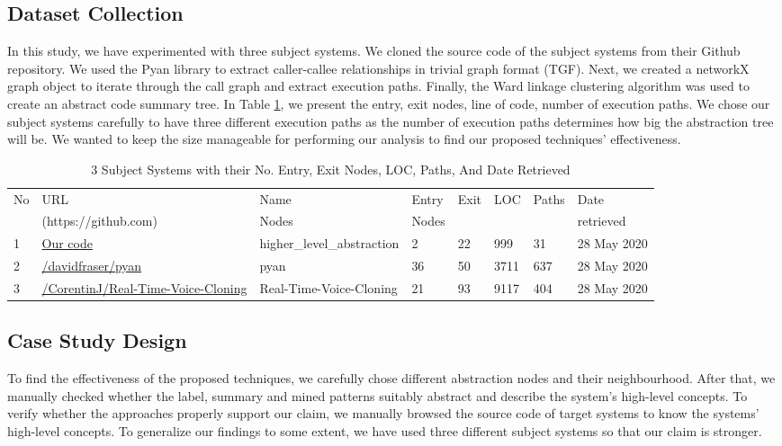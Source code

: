 \subsection{Dataset Collection}
In this study, we have experimented with three subject systems. We cloned the source code of the subject systems from their Github repository. We used the Pyan library to extract caller-callee relationships in trivial graph format (TGF). Next, we created a networkX graph object to iterate through the call graph and extract execution paths. Finally, the Ward linkage clustering algorithm was used to create an abstract code summary tree. In Table \ref{table:subject_systems}, we present the entry, exit nodes, line of code, number of execution paths. We chose our subject systems carefully to have three different execution paths as the number of execution paths determines how big the abstraction tree will be. We wanted to keep the size manageable for performing our analysis to find our proposed techniques' effectiveness. 
\begin{table}[h]%
\small
 \caption{3 Subject Systems with their No. Entry, Exit Nodes, LOC, Paths, And Date Retrieved}
\centering
\begin{tabular}{l|l|l|l|l|l|l|l}
No & URL & Name & Entry  & Exit  & LOC & Paths & Date \\
 & (https://github.com) & Nodes & Nodes  &   & &  & retrieved\\
\hline
1 & \url{Our code}& higher\_level\_abstraction & 2 & 22 & 999 & 31 &  28 May 2020\\
2 & \url{/davidfraser/pyan} & pyan & 36 & 50 & 3711 & 637 & 28 May 2020\\
3 & \url{/CorentinJ/Real-Time-Voice-Cloning}& Real-Time-Voice-Cloning & 21 & 93 & 9117 & 404 & 28 May 2020\\


\end{tabular}
\label{table:subject_systems}
\end{table}


\subsection{Case Study Design}
To find the effectiveness of the proposed techniques, we carefully chose different abstraction nodes and their neighbourhood. After that, we manually checked whether the label, summary and mined patterns suitably abstract and describe the system's high-level concepts. To verify whether the approaches properly support our claim, we manually browsed the source code of target systems to know the systems' high-level concepts. To generalize our findings to some extent, we have used three different subject systems so that our claim is stronger.



